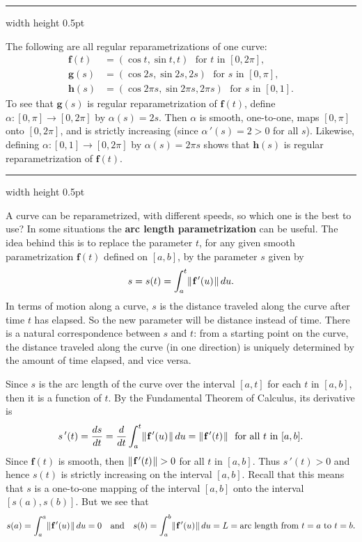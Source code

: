 \smallskip
\hrule width \textwidth height 0.5pt
\begin{exmp}\label{exmp:paramhelix}
 The following are all regular reparametrizations of one curve:
 \begin{align*}
  \textbf{f}(t) &= (\cos t , \sin t , t) \text{~~for $t$ in~$[0,2\pi]$},\\
  \textbf{g}(s) &= (\cos 2s , \sin 2s , 2s) \text{~~for $s$ in~$[0,\pi]$},\\
  \textbf{h}(s) &= (\cos 2\pi s , \sin 2\pi s , 2\pi s) \text{~~for $s$ in~$[0,1]$.}
 \end{align*}
 To see that $\textbf{g}(s)$ is regular reparametrization of  $\textbf{f}(t)$, define $\alpha:[0,\pi] \rightarrow [0,2\pi]$ by
 $\alpha(s) = 2s$. 
 Then $\alpha$ is smooth, one-to-one, maps $[0,\pi]$ onto $[0,2\pi]$, and is strictly increasing
 (since $\alpha\,'(s) = 2 > 0$ for all $s$). 
 Likewise, defining $\alpha:[0,1] \rightarrow [0,2\pi]$ by
 $\alpha(s) = 2\pi s$ shows that $\textbf{h}(s)$ is regular reparametrization of  $\textbf{f}(t)$.
\end{exmp}
\hrule width \textwidth height 0.5pt
\vskip3mm

A curve can be reparametrized, with different speeds, so which one is the best to use? In some situations
the \textbf{arc length parametrization} can be useful. The idea behind this is to replace the parameter $t$, for any
given smooth parametrization $\textbf{f}(t)$ defined on $[a,b]$, by the parameter $s$ given by
\begin{equation}\label{eqn:arclenfcn}
 s = s(t) = \int_{a}^{t} \lVert\mspace{1mu}\textbf{f}\,'(u)\mspace{1mu}\rVert\,du .
\end{equation}
In terms of motion along a curve, $s$ is the distance traveled along the curve after time $t$ has elapsed.
So the new parameter will be distance instead of time.
There is a natural correspondence between $s$ and $t$: from a starting point on the curve, the distance
traveled along the curve (in one direction) is uniquely determined by the amount of time elapsed, and vice versa.

Since $s$ is the arc length of the curve over the interval $[a,t]$ for each $t$ in $[a,b]$, then it is a function
of $t$. By the Fundamental Theorem of Calculus, its derivative is
\begin{displaymath}
 s\,'(t) = \dfrac{ds}{dt} = \dfrac{d}{dt} \int_{a}^{t} \lVert\mspace{1mu}\textbf{f}\,'(u)\mspace{1mu}\rVert\,du =
 \lVert\mspace{1mu}\textbf{f}\,'(t)\mspace{1mu}\rVert \text{~~for all $t$ in $[a,b]$.}
\end{displaymath}
Since $\textbf{f}(t)$ is smooth, then $\lVert\mspace{1mu}\textbf{f}\,'(t)\mspace{1mu}\rVert > 0$ for all $t$ in $[a,b]$. Thus $s\,'(t) > 0$
and hence $s(t)$ is strictly increasing on the interval $[a,b]$. Recall that this means that $s$ is a one-to-one mapping
of the interval $[a,b]$ onto the interval $[s(a),s(b)]$. But we see that
\begin{displaymath}
 s(a) = \int_{a}^{a} \lVert\mspace{1mu}\textbf{f}\,'(u)\mspace{1mu}\rVert\,du = 0 \quad \text{and} \quad
 s(b) = \int_{a}^{b} \lVert\mspace{1mu}\textbf{f}\,'(u)\mspace{1mu}\rVert\,du = L = \text{arc length from $t = a$ to $t = b$.}
\end{displaymath}

